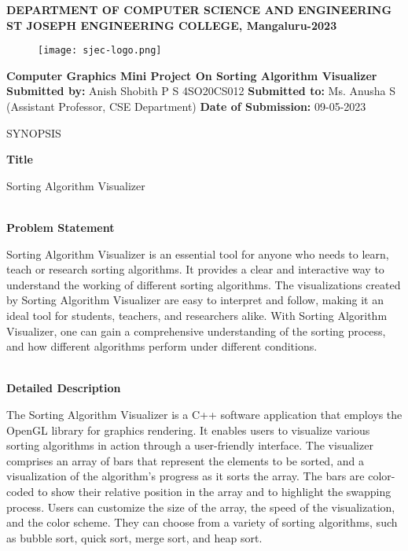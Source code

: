 \documentclass[a4paper]{article}
\begin{document}
\begin{center}
\textbf{{\Large DEPARTMENT OF COMPUTER SCIENCE AND ENGINEERING\break
      ST JOSEPH ENGINEERING COLLEGE, Mangaluru-2023}}
\break
\begin{figure}[H]
  \centering
  \texttt{[image: sjec-logo.png]}
\end{figure}
\par\bigskip
\textbf{\huge Computer Graphics Mini Project\break\break
  On\break\break
  {\color{red}\huge Sorting Algorithm Visualizer}}
\break\break\break
{\Large\textbf{Submitted by:\break}}
{\Large{\color{red} Anish Shobith P S \hspace{1cm} 4SO20CS012\break\break\break}}
{\Large\textbf{Submitted to:\break}}
{\Large Ms. Anusha S\break
  (Assistant Professor, CSE Department)\break\break\break}
{\Large\textbf{Date of Submission: }}{\Large 09-05-2023}\break
\end{center}
\newpage
\begin{center}
{\Huge SYNOPSIS}
\end{center}
\bigskip
\textbf{\huge Title}
\begin{justify}
{\Large Sorting Algorithm Visualizer}
\end{justify}
\noindent
\\
\textbf{\huge Problem Statement}
\begin{justify}
{\Large Sorting Algorithm Visualizer is an essential tool for anyone who needs to learn, teach or research sorting algorithms. It provides a clear and interactive way to understand the working of different sorting algorithms.
The visualizations created by Sorting Algorithm Visualizer are easy to interpret and follow, making it an ideal tool for students, teachers, and researchers alike. With Sorting Algorithm Visualizer, one can gain a comprehensive understanding of the sorting process, and how different algorithms perform under different conditions.}
\end{justify}
\noindent
\\
\textbf{\huge Detailed Description}
\begin{justify}
{\Large The Sorting Algorithm Visualizer is a C++ software application that employs the OpenGL library for graphics rendering. It enables users to visualize various sorting algorithms in action through a user-friendly interface. The visualizer comprises an array of bars that represent the elements to be sorted, and a visualization of the algorithm's progress as it sorts the array.
The bars are color-coded to show their relative position in the array and to highlight the swapping process. Users can customize the size of the array, the speed of the visualization, and the color scheme. They can choose from a variety of sorting algorithms, such as bubble sort, quick sort, merge sort, and heap sort.}
\end{justify}
\end{document}

